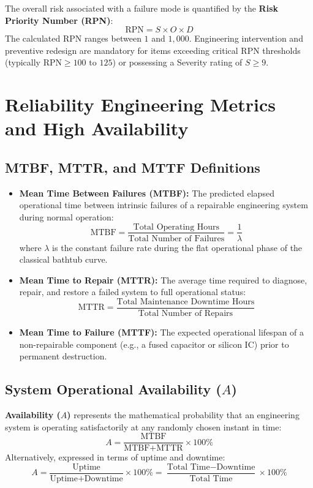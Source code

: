\begin{keyconcept}
The overall risk associated with a failure mode is quantified by the \textbf{Risk Priority Number (RPN)}:
\[
\boxed{\text{RPN} = S \times O \times D}
\]
The calculated RPN ranges between $1$ and $1,000$. Engineering intervention and preventive redesign are mandatory for items exceeding critical RPN thresholds (typically $\text{RPN} \ge 100\text{ to }125$) or possessing a Severity rating of $S \ge 9$.
\end{keyconcept}

\section{Reliability Engineering Metrics and High Availability}

\subsection{MTBF, MTTR, and MTTF Definitions}
\begin{itemize}[leftmargin=*]
    \item \textbf{Mean Time Between Failures (MTBF):} The predicted elapsed operational time between intrinsic failures of a repairable engineering system during normal operation:
    \[
    \text{MTBF} = \frac{\text{Total Operating Hours}}{\text{Total Number of Failures}} = \frac{1}{\lambda}
    \]
    where $\lambda$ is the constant failure rate during the flat operational phase of the classical bathtub curve.
    \item \textbf{Mean Time to Repair (MTTR):} The average time required to diagnose, repair, and restore a failed system to full operational status:
    \[
    \text{MTTR} = \frac{\text{Total Maintenance Downtime Hours}}{\text{Total Number of Repairs}}
    \]
    \item \textbf{Mean Time to Failure (MTTF):} The expected operational lifespan of a non-repairable component (e.g., a fused capacitor or silicon IC) prior to permanent destruction.
\end{itemize}

\subsection{System Operational Availability ($A$)}
\textbf{Availability ($A$)} represents the mathematical probability that an engineering system is operating satisfactorily at any randomly chosen instant in time:
\[
\boxed{A = \frac{\text{MTBF}}{\text{MTBF} + \text{MTTR}} \times 100\%}
\]
Alternatively, expressed in terms of uptime and downtime:
\[
A = \frac{\text{Uptime}}{\text{Uptime} + \text{Downtime}} \times 100\% = \frac{\text{Total Time} - \text{Downtime}}{\text{Total Time}} \times 100\%
\]

